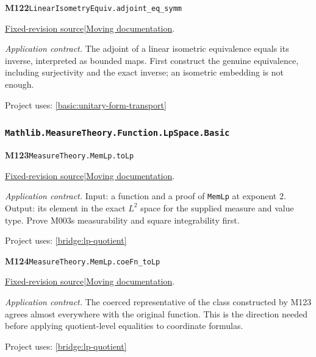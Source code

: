 \documentclass[11pt,a4paper]{article}
\theoremstyle{definition}
\theoremstyle{remark}
\begin{document}
\noindent\textbf{M122}\label{base:M122}\quad\nolinkurl{LinearIsometryEquiv.adjoint_eq_symm}

\href{https://github.com/leanprover-community/mathlib4/blob/9bac2d0692944a775113f7c130fd5e5b4608a854/Mathlib/Analysis/InnerProductSpace/Adjoint.lean}{Fixed-revision source}\quad|\quad\href{https://leanprover-community.github.io/mathlib4_docs/Mathlib/Analysis/InnerProductSpace/Adjoint.html#LinearIsometryEquiv.adjoint_eq_symm}{Moving documentation}.\par
\noindent\textit{Application contract.} The adjoint of a linear isometric equivalence equals its inverse, interpreted as bounded maps. First construct the genuine equivalence, including surjectivity and the exact inverse; an isometric embedding is not enough.\par
{\small Project uses: \ref{basic:unitary-form-transport}}\par\medskip

\subsubsection*{\nolinkurl{Mathlib.MeasureTheory.Function.LpSpace.Basic}}
\noindent\textbf{M123}\label{base:M123}\quad\nolinkurl{MeasureTheory.MemLp.toLp}

\href{https://github.com/leanprover-community/mathlib4/blob/9bac2d0692944a775113f7c130fd5e5b4608a854/Mathlib/MeasureTheory/Function/LpSpace/Basic.lean}{Fixed-revision source}\quad|\quad\href{https://leanprover-community.github.io/mathlib4_docs/Mathlib/MeasureTheory/Function/LpSpace/Basic.html#MeasureTheory.MemLp.toLp}{Moving documentation}.\par
\noindent\textit{Application contract.} Input: a function and a proof of \nolinkurl{MemLp} at exponent $2$. Output: its element in the exact $L^2$ space for the supplied measure and value type. Prove M003\textquotesingle s measurability and square integrability first.\par
{\small Project uses: \ref{bridge:lp-quotient}}\par\medskip

\noindent\textbf{M124}\label{base:M124}\quad\nolinkurl{MeasureTheory.MemLp.coeFn_toLp}

\href{https://github.com/leanprover-community/mathlib4/blob/9bac2d0692944a775113f7c130fd5e5b4608a854/Mathlib/MeasureTheory/Function/LpSpace/Basic.lean}{Fixed-revision source}\quad|\quad\href{https://leanprover-community.github.io/mathlib4_docs/Mathlib/MeasureTheory/Function/LpSpace/Basic.html#MeasureTheory.MemLp.coeFn_toLp}{Moving documentation}.\par
\noindent\textit{Application contract.} The coerced representative of the class constructed by M123 agrees almost everywhere with the original function. This is the direction needed before applying quotient-level equalities to coordinate formulas.\par
{\small Project uses: \ref{bridge:lp-quotient}}\par\medskip
\end{document}
